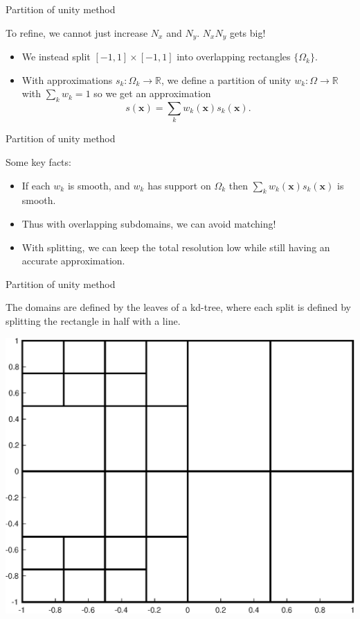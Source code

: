 \documentclass{beamer}
\newcommand{\R}{\mathbb{R}}
\newcommand{\vect}[1]{\mathbf{#1}}
\begin{document}
\begin{frame}{Partition of unity method}

To refine, we cannot just increase $N_x$ and $N_y$. $N_x N_y$ gets big!

\bigskip

\begin{itemize}
\item We instead split $[-1,1] \times [-1,1]$ into overlapping rectangles $\{ \Omega_k \}$.
\item With approximations $s_k:\Omega_k \to \R$, we define a partition of unity $w_k:\Omega \to \R$ with $\sum_k w_k=1$ so we get an approximation $$s(\vect{x}) = \sum_k w_k(\vect{x})s_k(\vect{x}).$$
\end{itemize}

\end{frame}

\begin{frame}{Partition of unity method}
\begin{center}
Some key facts:
\end{center}

\begin{itemize}
\item If each $w_k$ is smooth, and $w_k$ has support on $\Omega_k$ then $\sum_k w_k(\vect{x})s_k(\vect{x})$ is smooth.
\item Thus with overlapping subdomains, we can avoid matching!
\item With splitting, we can keep the total resolution low while still having an accurate approximation.
\end{itemize}
\end{frame}

\begin{frame}{Partition of unity method}

The domains are defined by the leaves of a kd-tree, where each split is defined by splitting the rectangle in half with a line.
\bigskip

\begin{center}
\includegraphics[scale = 0.4]{zonePlot.eps}
\end{center}
\end{frame}
\end{document}
